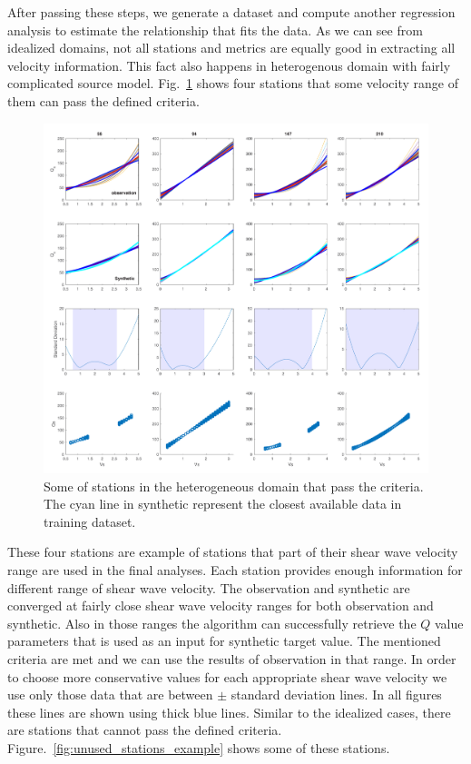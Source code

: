 After passing these steps, we generate a dataset and compute another regression analysis to estimate the \qsvs{} relationship that fits the data. As we can see from idealized domains, not all stations and metrics are equally good in extracting all velocity information. This fact also happens in heterogenous domain with fairly complicated source model. Fig.~\ref{fig:used_stations_example} shows four stations that some velocity range of them can pass the defined criteria. 

  \begin{figure}[ht]
    \centering
    \includegraphics[width=\textwidth]{figures/pdf/Figure_20.pdf}
    \caption{Some of stations in the heterogeneous domain that pass the criteria. The cyan line in synthetic represent the closest available data in training dataset.}
    \label{fig:used_stations_example}
\end{figure}

These four stations are example of stations that part of their shear wave velocity range are used in the final analyses. Each station provides enough information for different range of shear wave velocity. The observation and synthetic are converged at fairly close shear wave velocity ranges for both observation and synthetic. Also in those ranges the algorithm can successfully retrieve the $Q$ value parameters that is used as an input for synthetic target value. The mentioned criteria are met and we can use the results of observation in that range. In order to choose more conservative values for each appropriate shear wave velocity we use only those data that are between $\pm$ standard deviation lines. In all figures these lines are shown using thick blue lines. Similar to the idealized cases, there are stations that cannot pass the defined criteria. Figure.~\ref{fig:unused_stations_example} shows some of these stations. 


